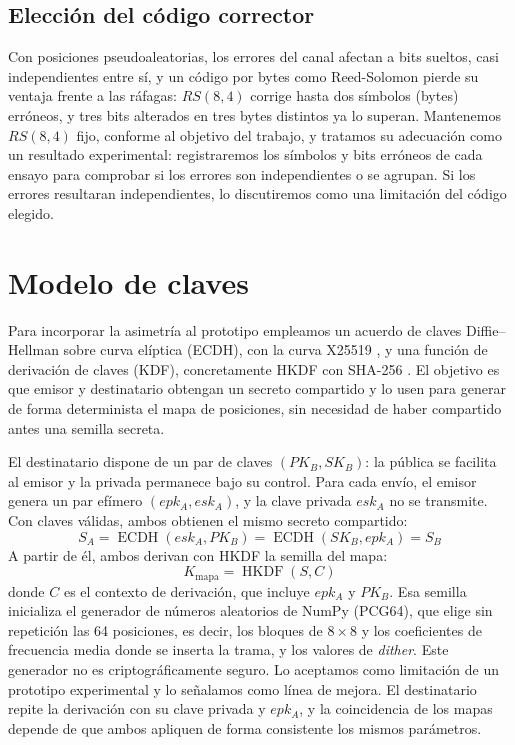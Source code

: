 \documentclass[IB]{TFUOC}%
\begin{document}
\subsection{Elección del código corrector}
\label{subsec:eleccion_codigo}

Con posiciones pseudoaleatorias, los errores del canal afectan a bits sueltos, casi independientes entre sí, y un código por bytes como Reed-Solomon pierde su ventaja frente a las ráfagas: $RS(8,4)$ corrige hasta dos símbolos (bytes) erróneos, y tres bits alterados en tres bytes distintos ya lo superan. Mantenemos $RS(8,4)$ fijo, conforme al objetivo del trabajo, y tratamos su adecuación como un resultado experimental: registraremos los símbolos y bits erróneos de cada ensayo para comprobar si los errores son independientes o se agrupan. Si los errores resultaran independientes, lo discutiremos como una limitación del código elegido.


\section{Modelo de claves}
\label{sec:modelo_claves}

Para incorporar la asimetría al prototipo empleamos un acuerdo de claves Diffie--Hellman sobre curva elíptica (ECDH), con la curva X25519 \cite{rfc7748}, y una función de derivación de claves (KDF), concretamente HKDF con SHA-256 \cite{rfc5869}. El objetivo es que emisor y destinatario obtengan un secreto compartido y lo usen para generar de forma determinista el mapa de posiciones, sin necesidad de haber compartido antes una semilla secreta.

El destinatario dispone de un par de claves $(PK_B, SK_B)$: la pública se facilita al emisor y la privada permanece bajo su control. Para cada envío, el emisor genera un par efímero $(epk_A, esk_A)$, y la clave privada $esk_A$ no se transmite. Con claves válidas, ambos obtienen el mismo secreto compartido:
\begin{equation}
S_A = \operatorname{ECDH}(esk_A, PK_B) = \operatorname{ECDH}(SK_B, epk_A) = S_B
\end{equation}
A partir de él, ambos derivan con HKDF la semilla del mapa:
\begin{equation}
K_{\mathrm{mapa}} = \operatorname{HKDF}(S, C)
\end{equation}
donde $C$ es el contexto de derivación, que incluye $epk_A$ y $PK_B$. Esa semilla inicializa el generador de números aleatorios de NumPy (PCG64), que elige sin repetición las 64 posiciones, es decir, los bloques de $8\times8$ y los coeficientes de frecuencia media donde se inserta la trama, y los valores de \textit{dither}. Este generador no es criptográficamente seguro. Lo aceptamos como limitación de un prototipo experimental y lo señalamos como línea de mejora. El destinatario repite la derivación con su clave privada y $epk_A$, y la coincidencia de los mapas depende de que ambos apliquen de forma consistente los mismos parámetros.
\end{document}
